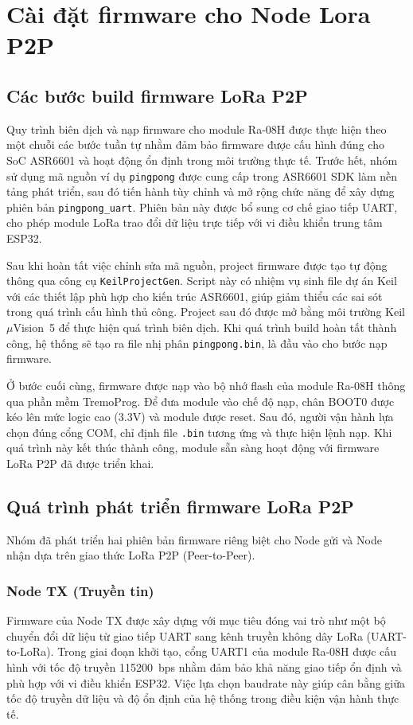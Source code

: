 \section{Cài đặt firmware cho Node Lora P2P}

\subsection{Các bước build firmware LoRa P2P}
Quy trình biên dịch và nạp firmware cho module Ra-08H được thực hiện theo một chuỗi
các bước tuần tự nhằm đảm bảo firmware được cấu hình đúng cho SoC ASR6601 và hoạt
động ổn định trong môi trường thực tế. Trước hết, nhóm sử dụng mã nguồn ví dụ
\texttt{pingpong} được cung cấp trong ASR6601 SDK làm nền tảng phát triển, sau đó
tiến hành tùy chỉnh và mở rộng chức năng để xây dựng phiên bản
\texttt{pingpong\_uart}. Phiên bản này được bổ sung cơ chế giao tiếp UART, cho phép
module LoRa trao đổi dữ liệu trực tiếp với vi điều khiển trung tâm ESP32.

Sau khi hoàn tất việc chỉnh sửa mã nguồn, project firmware được tạo tự động thông qua
công cụ \texttt{KeilProjectGen}. Script này có nhiệm vụ sinh file dự án Keil với các
thiết lập phù hợp cho kiến trúc ASR6601, giúp giảm thiểu các sai sót trong quá trình
cấu hình thủ công. Project sau đó được mở bằng môi trường Keil $\mu$Vision~5 để
thực hiện quá trình biên dịch. Khi quá trình build hoàn tất thành công, hệ thống sẽ
tạo ra file nhị phân \texttt{pingpong.bin}, là đầu vào cho bước nạp firmware.

Ở bước cuối cùng, firmware được nạp vào bộ nhớ flash của module Ra-08H thông qua
phần mềm TremoProg. Để đưa module vào chế độ nạp, chân BOOT0 được kéo lên mức
logic cao (3.3V) và module được reset. Sau đó, người vận hành lựa chọn đúng cổng
COM, chỉ định file \texttt{.bin} tương ứng và thực hiện lệnh nạp. Khi quá trình này
kết thúc thành công, module sẵn sàng hoạt động với firmware LoRa P2P đã được triển
khai.

\subsection{Quá trình phát triển firmware LoRa P2P}
Nhóm đã phát triển hai phiên bản firmware riêng biệt cho Node gửi và Node nhận dựa trên giao thức LoRa P2P (Peer-to-Peer).

\subsubsection{Node TX (Truyền tin)}
Firmware của Node TX được xây dựng với mục tiêu đóng vai trò như một bộ chuyển đổi
dữ liệu từ giao tiếp UART sang kênh truyền không dây LoRa (UART-to-LoRa). Trong
giai đoạn khởi tạo, cổng UART1 của module Ra-08H được cấu hình với tốc độ truyền
115200~bps nhằm đảm bảo khả năng giao tiếp ổn định và phù hợp với vi điều khiển
ESP32. Việc lựa chọn baudrate này giúp cân bằng giữa tốc độ truyền dữ liệu và độ
ổn định của hệ thống trong điều kiện vận hành thực tế.

